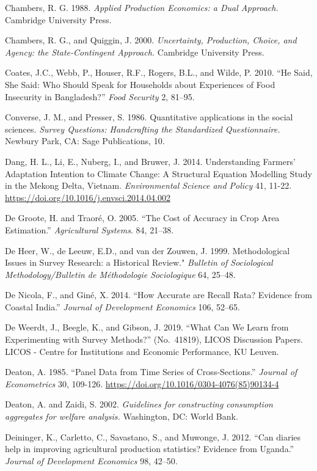 \documentclass[
]{book}
\begin{document}
Chambers, R. G. 1988. \emph{Applied Production Economics: a Dual Approach.} Cambridge University Press.

Chambers, R. G., and Quiggin, J. 2000. \emph{Uncertainty, Production, Choice, and Agency: the State-Contingent Approach.} Cambridge University Press.

Coates, J.C., Webb, P., Houser, R.F., Rogers, B.L., and Wilde, P. 2010. ``He Said, She Said: Who Should Speak for Households about Experiences of Food Insecurity in Bangladesh?'' \emph{Food Security} 2, 81--95.

Converse, J. M., and Presser, S. 1986. Quantitative applications in the social sciences. \emph{Survey Questions: Handcrafting the Standardized Questionnaire.} Newbury Park, CA: Sage Publications, 10.

Dang, H. L., Li, E., Nuberg, I., and Bruwer, J. 2014. Understanding Farmers' Adaptation Intention to Climate Change: A Structural Equation Modelling Study in the Mekong Delta, Vietnam. \emph{Environmental Science and Policy} 41, 11-22. \url{https://doi.org/10.1016/j.envsci.2014.04.002}

De Groote, H. and Traoré, O. 2005. ``The Cost of Accuracy in Crop Area Estimation.'' \emph{Agricultural Systems}. 84, 21--38.

De Heer, W., de Leeuw, E.D., and van der Zouwen, J. 1999. Methodological Issues in Survey Research: a Historical Review." \emph{Bulletin of Sociological Methodology/Bulletin de Méthodologie Sociologique} 64, 25--48.

De Nicola, F., and Giné, X. 2014. ``How Accurate are Recall Rata? Evidence from Coastal India.'' \emph{Journal of Development Economics} 106, 52--65.

De Weerdt, J., Beegle, K., and Gibson, J. 2019. ``What Can We Learn from Experimenting with Survey Methods?'' (No.~41819), LICOS Discussion Papers. LICOS - Centre for Institutions and Economic Performance, KU Leuven.

Deaton, A. 1985. ``Panel Data from Time Series of Cross-Sections.'' \emph{Journal of Econometrics} 30, 109-126. \url{https://doi.org/10.1016/0304-4076(85)90134-4}

Deaton, A. and Zaidi, S. 2002. \emph{Guidelines for constructing consumption aggregates for welfare analysis.} Washington, DC: World Bank.

Deininger, K., Carletto, C., Savastano, S., and Muwonge, J. 2012. ``Can diaries help in improving agricultural production statistics? Evidence from Uganda.'' \emph{Journal of Development Economics} 98, 42--50.
\end{document}
